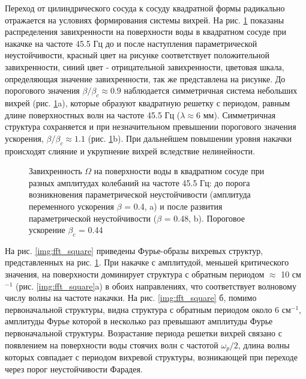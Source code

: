 Переход от цилиндрического сосуда к сосуду квадратной формы радикально отражается на условиях формирования системы вихрей. На рис. \ref{img:vort_square} показаны распределения завихренности на поверхности воды в квадратном сосуде при накачке на частоте 45.5 Гц до и после наступления параметрической неустойчивости, красный цвет на рисунке соответствует положительной завихренности, синий цвет - отрицательной завихренности, цветовая шкала, определяющая значение завихренности, так же представлена на рисунке. До порогового значения $\beta/\beta_c \approx 0.9$ наблюдается симметричная система небольших вихрей (рис. \ref{img:vort_square}a), которые образуют квадратную решетку с периодом, равным длине поверхностных волн на частоте 45.5 Гц ($\lambda \approx 6$ мм). Симметричная структура сохраняется и при незначительном превышении порогового значения ускорения, $\beta/\beta_c \approx 1.1$ (рис. \ref{img:vort_square}b). При дальнейшем повышении уровня накачки происходят слияние и укрупнение вихрей вследствие нелинейности.

\begin{figure}[ht]
 \begin{minipage}[ht]{0.49\linewidth}
 \end{minipage}
 \hfill
 \begin{minipage}[ht]{0.49\linewidth}
 \end{minipage}
 \caption{Завихренность $\Omega$ на поверхности воды в квадратном сосуде при разных амплитудах колебаний на частоте 45.5 Гц: до порога возникновения параметрической неустойчивости (амплитуда переменного ускорения $\beta$ = 0.4, a) и после развития параметрической неустойчивости ($\beta$ = 0.48, b). Пороговое ускорение $\beta_c$ = 0.44}
 \label{img:vort_square} 
\end{figure}


На рис. \ref{img:fft_square} приведены Фурье-образы вихревых структур, представленных на рис. \ref{img:vort_square}. При накачке с амплитудой, меньшей критического значения, на поверхности доминирует структура с обратным периодом $\approx$ 10 см$^{-1}$ (рис. \ref{img:fft_square}a) в обоих направлениях, что соответствует волновому числу волны на частоте накачки. На рис. \ref{img:fft_square} б, помимо первоначальной структуры, видна структура с обратным периодом около 6 см$^{-1}$, амплитуды Фурье которой в несколько раз превышают амплитуды Фурье первоначальной структуры. Возрастание периода решетки вихрей связано с появлением на поверхности воды стоячих волн с частотой $\omega_p/2$, длина волны которых совпадает с периодом вихревой структуры, возникающей при переходе через порог неустойчивости Фарадея. 


